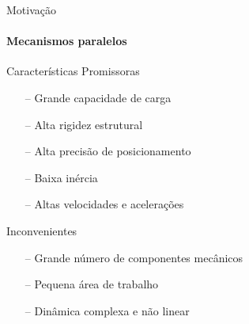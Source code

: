 \documentclass[25pt,landscape]{beamer}
\begin{document}
\begin{frame}
    \titlepage
\end{frame}








\begin{frame}{Motiva\c{c}\~ao}
    \framesubtitle{Mecanismos paralelos}
    \pause
    \begin{block}{Caracter\'isticas Promissoras}
    	\pause
        \begin{itemize} 
            \item[--] Grande capacidade de carga \\[8pt]
            \item[--] Alta rigidez estrutural \\[8pt]
            \item[--] Alta precis\~ao de posicionamento \\[8pt]
            \item[--] Baixa in\'ercia \\[8pt]
            \item[--] Altas velocidades e acelera\c{c}\~oes \\[8pt]
        \end{itemize}
    \end{block}
    \pause
    \begin{block}{Inconvenientes}
    	\pause
        \begin{itemize}
        	\item[--] Grande n\'umero de componentes mec\^anicos \\[8pt]
            \item[--] Pequena \'area de trabalho \\[8pt]
            \item[--] Din\^amica complexa e n\~ao linear \\[8pt]
        \end{itemize}
    \end{block}
\end{frame}
\end{document}

